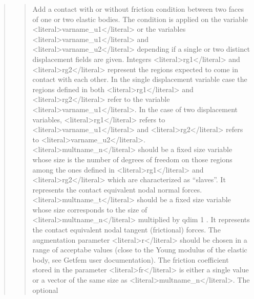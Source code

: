 \documentclass[a4paper,11pt,english]{sphinxmanual}
\begin{document}
\begin{quote}
\begin{quote}
\sphinxAtStartPar
Add a contact with or without friction condition between two faces of
one or two elastic bodies. The condition is applied on the variable
\textless{}literal\textgreater{}varname\_u1\textless{}/literal\textgreater{} or the variables \textless{}literal\textgreater{}varname\_u1\textless{}/literal\textgreater{} and \textless{}literal\textgreater{}varname\_u2\textless{}/literal\textgreater{} depending
if a single or two distinct displacement fields are given. Integers
\textless{}literal\textgreater{}rg1\textless{}/literal\textgreater{} and \textless{}literal\textgreater{}rg2\textless{}/literal\textgreater{} represent the regions expected to come in contact with
each other. In the single displacement variable case the regions defined
in both \textless{}literal\textgreater{}rg1\textless{}/literal\textgreater{} and \textless{}literal\textgreater{}rg2\textless{}/literal\textgreater{} refer to the variable \textless{}literal\textgreater{}varname\_u1\textless{}/literal\textgreater{}. In the case
of two displacement variables, \textless{}literal\textgreater{}rg1\textless{}/literal\textgreater{} refers to \textless{}literal\textgreater{}varname\_u1\textless{}/literal\textgreater{} and \textless{}literal\textgreater{}rg2\textless{}/literal\textgreater{}
refers to \textless{}literal\textgreater{}varname\_u2\textless{}/literal\textgreater{}. \textless{}literal\textgreater{}multname\_n\textless{}/literal\textgreater{} should be a fixed size variable
whose size is the number of degrees of freedom on those regions among
the ones defined in \textless{}literal\textgreater{}rg1\textless{}/literal\textgreater{} and \textless{}literal\textgreater{}rg2\textless{}/literal\textgreater{} which are characterized as “slaves”.
It represents the contact equivalent nodal normal forces. \textless{}literal\textgreater{}multname\_t\textless{}/literal\textgreater{}
should be a fixed size variable whose size corresponds to the size of
\textless{}literal\textgreater{}multname\_n\textless{}/literal\textgreater{} multiplied by qdim \sphinxhyphen{} 1 . It represents the contact
equivalent nodal tangent (frictional) forces. The augmentation parameter
\textless{}literal\textgreater{}r\textless{}/literal\textgreater{} should be chosen in a range of acceptabe values (close to the Young
modulus of the elastic body, see Getfem user documentation). The
friction coefficient stored in the parameter \textless{}literal\textgreater{}fr\textless{}/literal\textgreater{} is either a single
value or a vector of the same size as \textless{}literal\textgreater{}multname\_n\textless{}/literal\textgreater{}. The optional

\end{quote}
\end{quote}
\end{document}
